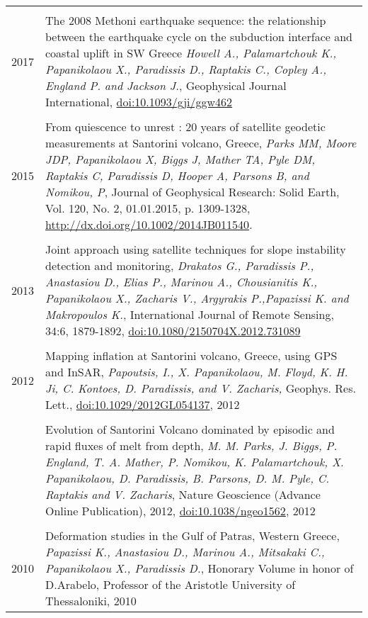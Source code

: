 \documentclass[8pt]{extarticle} %
\begin{document}
\begin{longtable}{r|p{14cm}}
\multicolumn{2}{c}{} \\
  \textsc{2017}
%
  & The 2008 Methoni earthquake sequence: the relationship between the earthquake cycle on the subduction interface and coastal uplift in SW Greece
  \emph{Howell A., Palamartchouk K., Papanikolaou X., Paradissis D., Raptakis C., Copley A., England P. and Jackson J.}, Geophysical Journal International, \href{https://doi.org/10.1093/gji/ggw462}{doi:10.1093/gji/ggw462}\\
%
\multicolumn{2}{c}{} \\
  \textsc{2015}
%
  & From quiescence to unrest : 20 years of satellite geodetic measurements at Santorini volcano, Greece,
  \emph{Parks MM, Moore JDP, Papanikolaou X, Biggs J, Mather TA, Pyle DM, Raptakis C, Paradissis D, Hooper A, Parsons B, and Nomikou, P}, Journal of Geophysical Research: Solid Earth, Vol. 120, No. 2, 01.01.2015, p. 1309-1328, \href{http://dx.doi.org/10.1002/2014JB011540}{http://dx.doi.org/10.1002/2014JB011540}.\\
%  
\multicolumn{2}{c}{} \\ 
  \textsc{2013}
%
  & Joint approach using satellite techniques for slope instability detection and monitoring,
  \emph{Drakatos G., Paradissis P., Anastasiou D., Elias P., Marinou A., Chousianitis K., Papanikolaou X., Zacharis V., Argyrakis P.,Papazissi K. and Makropoulos K.},
  International Journal of Remote Sensing, 34:6, 1879-1892, \href{http://www.tandfonline.com/doi/abs/10.1080/2150704X.2012.731089#.Uxni9meIaig}{doi:10.1080/2150704X.2012.731089}\\
%
\multicolumn{2}{c}{} \\ 
  \textsc{2012}
  & Mapping inflation at Santorini volcano, Greece, using GPS and InSAR,
  \emph{Papoutsis, I., X. Papanikolaou, M. Floyd, K. H. Ji, C. Kontoes, D. Paradissis, and V. Zacharis,}
  Geophys. Res. Lett., \href{http://www.agu.org/pubs/crossref/pip/2012GL054137.shtml}{doi:10.1029/2012GL054137}, 2012\\
%
  &\\
%
  & Evolution of Santorini Volcano dominated by episodic and rapid fluxes of melt from depth,
  \emph{M. M. Parks, J. Biggs, P. England, T. A. Mather, P. Nomikou, K. Palamartchouk, X. Papanikolaou, D. Paradissis, B. Parsons, D. M. Pyle, C. Raptakis and V. Zacharis},
  Nature Geoscience (Advance Online Publication), 2012, \href{http://www.nature.com/ngeo/journal/v5/n10/full/ngeo1562.html}{doi:10.1038/ngeo1562}, 2012\\
%
\multicolumn{2}{c}{} \\ 
  \textsc{2010}
  & Deformation studies in the Gulf of Patras, Western Greece,
  \emph{Papazissi K., Anastasiou D., Marinou A., Mitsakaki C., Papanikolaou X., Paradissis D.}, 
  Honorary Volume in honor of D.Arabelo, Professor of the Aristotle University of Thessaloniki, 2010\\
\end{longtable}
%
\end{document}

